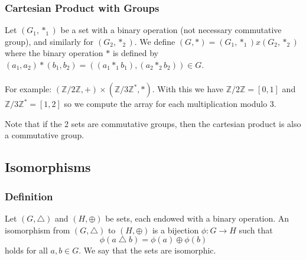 \documentclass{article}
\begin{document}
\subsubsection{Cartesian Product with Groups} Let $ (G_1, *_1) $ be a set with a binary operation (not necessary commutative group), and similarly for $ (G_2, *_2) $. We define $ (G, *) = (G_1, *_1) x (G_2, *_2) $ where the binary operation $ * $ is defined by $ (a_1,a_2)*(b_1,b_2) = ((a_1 *_1 b_1),(a_2 *_2 b_2)) \in G $.
\\
\\
For example: $ (\mathbb{Z}/2\mathbb{Z}, +) \times (\mathbb{Z}/3\mathbb{Z}^{*}, *) $. With this we have $ \mathbb{Z}/2\mathbb{Z} = [0,1] $ and $ \mathbb{Z}/3\mathbb{Z}^{*} = [1,2] $ so we compute the array for each multiplication modulo 3.
\begin{tcolorbox}[width=12.1cm, leftrule=3mm]
Note that if the 2 sets are commutative groups, then the cartesian product is also a commutative group. 
\end{tcolorbox}

\subsection{Isomorphisms}
\subsubsection{Definition}
\begin{tcolorbox}[sharp corners, colback=green!30, colframe=green!80!blue, title=Definition of Isomorphism]
Let $ (G,\bigtriangleup) $ and $ (H,\oplus) $ be sets, each endowed with a binary operation. An isomorphism from $ (G,\bigtriangleup) $ to $ (H,\oplus) $ is a bijection $ \phi: G \rightarrow H $ such that
\begin{equation}
\phi(a \bigtriangleup b) = \phi(a) \oplus \phi(b)
\end{equation}
holds for all $a,b \in G $. We say that the sets are isomorphic.
\end{tcolorbox}
\end{document}
